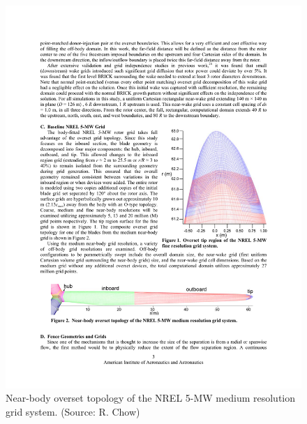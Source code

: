\begin{figure}[htbp]
 \centering
 \includegraphics{Figures/ch5Figures/OVERFLOWGrid}
 \caption{ Near-body overset topology of the NREL 5-MW medium resolution grid system. (Source: R. Chow)}
 \label{OFGrid}
\end{figure}   






